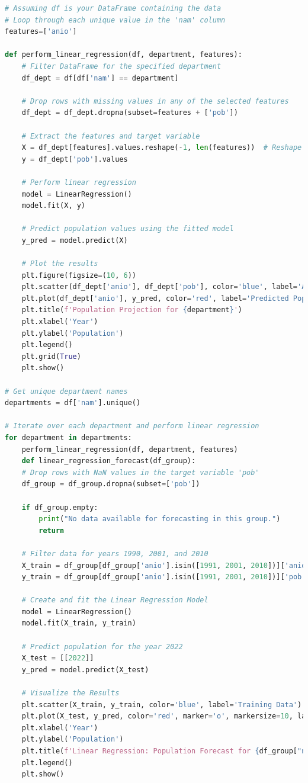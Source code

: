 \documentclass{article}
\theoremstyle{mytheoremstyle}
\theoremstyle{mytheoremstyle}
\theoremstyle{myproblemstyle}
\begin{document}
\begin{lstlisting}[language=Python, caption= Regresion Lineal.ipynb,label={lst:LR.ipynb}]
# Assuming df is your DataFrame containing the data
# Loop through each unique value in the 'nam' column
features=['anio']

def perform_linear_regression(df, department, features):
    # Filter DataFrame for the specified department
    df_dept = df[df['nam'] == department]
    
    # Drop rows with missing values in any of the selected features
    df_dept = df_dept.dropna(subset=features + ['pob'])
    
    # Extract the features and target variable
    X = df_dept[features].values.reshape(-1, len(features))  # Reshape X to be 2D array
    y = df_dept['pob'].values
    
    # Perform linear regression
    model = LinearRegression()
    model.fit(X, y)
    
    # Predict population values using the fitted model
    y_pred = model.predict(X)
    
    # Plot the results
    plt.figure(figsize=(10, 6))
    plt.scatter(df_dept['anio'], df_dept['pob'], color='blue', label='Actual Population')
    plt.plot(df_dept['anio'], y_pred, color='red', label='Predicted Population')
    plt.title(f'Population Projection for {department}')
    plt.xlabel('Year')
    plt.ylabel('Population')
    plt.legend()
    plt.grid(True)
    plt.show()

# Get unique department names
departments = df['nam'].unique()

# Iterate over each department and perform linear regression
for department in departments:
    perform_linear_regression(df, department, features)
    def linear_regression_forecast(df_group):
    # Drop rows with NaN values in the target variable 'pob'
    df_group = df_group.dropna(subset=['pob'])

    if df_group.empty:
        print("No data available for forecasting in this group.")
        return

    # Filter data for years 1990, 2001, and 2010
    X_train = df_group[df_group['anio'].isin([1991, 2001, 2010])]['anio'].values.reshape(-1, 1)
    y_train = df_group[df_group['anio'].isin([1991, 2001, 2010])]['pob'].values

    # Create and fit the Linear Regression Model
    model = LinearRegression()
    model.fit(X_train, y_train)

    # Predict population for the year 2022
    X_test = [[2022]]
    y_pred = model.predict(X_test)

    # Visualize the Results
    plt.scatter(X_train, y_train, color='blue', label='Training Data')
    plt.plot(X_test, y_pred, color='red', marker='o', markersize=10, label='Predicted Population for 2022')
    plt.xlabel('Year')
    plt.ylabel('Population')
    plt.title(f'Linear Regression: Population Forecast for {df_group["nam"].iloc[0]}')
    plt.legend()
    plt.show()


\end{lstlisting}
\end{document}
